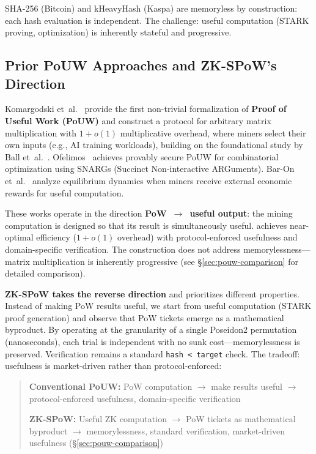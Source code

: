 \documentclass[11pt,a4paper]{article}
\begin{document}
SHA-256 (Bitcoin) and kHeavyHash (Kaspa) are memoryless by construction: each hash evaluation is independent. The challenge: useful computation (STARK proving, optimization) is inherently stateful and progressive.

\subsection{Prior PoUW Approaches and ZK-SPoW's Direction}
\label{sec:pouw-direction}

Komargodski et~al.~\cite{komargodski2025} provide the first non-trivial formalization of \textbf{Proof of Useful Work (PoUW)} and construct a protocol for arbitrary matrix multiplication with $1+o(1)$ multiplicative overhead, where miners select their own inputs (e.g., AI training workloads), building on the foundational study by Ball et~al.~\cite{ball2017}. Ofelimos~\cite{ofelimos} achieves provably secure PoUW for combinatorial optimization using SNARGs (Succinct Non-interactive ARGuments). Bar-On et~al.~\cite{baron2025} analyze equilibrium dynamics when miners receive external economic rewards for useful computation.

These works operate in the direction \textbf{PoW~$\to$~useful output}: the mining computation is designed so that its result is simultaneously useful. \cite{komargodski2025} achieves near-optimal efficiency ($1+o(1)$ overhead) with protocol-enforced usefulness and domain-specific verification. The construction does not address memorylessness---matrix multiplication is inherently progressive (see \S\ref{sec:pouw-comparison} for detailed comparison).

\textbf{ZK-SPoW takes the reverse direction} and prioritizes different properties. Instead of making PoW results useful, we start from useful computation (STARK proof generation) and observe that PoW tickets emerge as a mathematical byproduct. By operating at the granularity of a single Poseidon2 permutation (nanoseconds), each trial is independent with no sunk cost---memorylessness is preserved. Verification remains a standard \texttt{hash < target} check. The tradeoff: usefulness is market-driven rather than protocol-enforced:

\begin{quote}
\textbf{Conventional PoUW:} PoW computation $\to$ make results useful $\to$ protocol-enforced usefulness, domain-specific verification~\cite{ball2017,ofelimos,komargodski2025,baron2025}

\textbf{ZK-SPoW:} Useful ZK computation $\to$ PoW tickets as mathematical byproduct $\to$ memorylessness, standard verification, market-driven usefulness (\S\ref{sec:pouw-comparison})
\end{quote}
\end{document}
